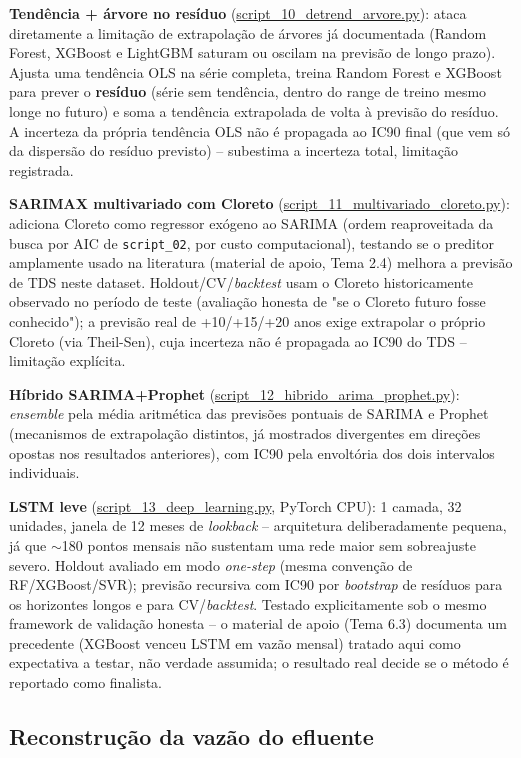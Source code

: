 \textbf{Tendência + árvore no resíduo} (\url{script_10_detrend_arvore.py}): ataca diretamente a limitação de extrapolação de árvores já documentada (Random Forest, XGBoost e LightGBM saturam ou oscilam na previsão de longo prazo). Ajusta uma tendência OLS na série completa, treina Random Forest e XGBoost para prever o \textbf{resíduo} (série sem tendência, dentro do range de treino mesmo longe no futuro) e soma a tendência extrapolada de volta à previsão do resíduo. A incerteza da própria tendência OLS não é propagada ao IC90 final (que vem só da dispersão do resíduo previsto) -- subestima a incerteza total, limitação registrada.

\textbf{SARIMAX multivariado com Cloreto} (\url{script_11_multivariado_cloreto.py}): adiciona Cloreto como regressor exógeno ao SARIMA (ordem reaproveitada da busca por AIC de \texttt{script\_02}, por custo computacional), testando se o preditor amplamente usado na literatura (material de apoio, Tema 2.4) melhora a previsão de TDS neste dataset. Holdout/CV/\textit{backtest} usam o Cloreto historicamente observado no período de teste (avaliação honesta de "se o Cloreto futuro fosse conhecido"); a previsão real de +10/+15/+20 anos exige extrapolar o próprio Cloreto (via Theil-Sen), cuja incerteza não é propagada ao IC90 do TDS -- limitação explícita.

\textbf{Híbrido SARIMA+Prophet} (\url{script_12_hibrido_arima_prophet.py}): \textit{ensemble} pela média aritmética das previsões pontuais de SARIMA e Prophet (mecanismos de extrapolação distintos, já mostrados divergentes em direções opostas nos resultados anteriores), com IC90 pela envoltória dos dois intervalos individuais.

\textbf{LSTM leve} (\url{script_13_deep_learning.py}, PyTorch CPU): 1 camada, 32 unidades, janela de 12 meses de \textit{lookback} -- arquitetura deliberadamente pequena, já que $\sim$180 pontos mensais não sustentam uma rede maior sem sobreajuste severo. Holdout avaliado em modo \textit{one-step} (mesma convenção de RF/XGBoost/SVR); previsão recursiva com IC90 por \textit{bootstrap} de resíduos para os horizontes longos e para CV/\textit{backtest}. Testado explicitamente sob o mesmo framework de validação honesta -- o material de apoio (Tema 6.3) documenta um precedente (XGBoost venceu LSTM em vazão mensal) tratado aqui como expectativa a testar, não verdade assumida; o resultado real decide se o método é reportado como finalista.

\subsection{Reconstrução da vazão do efluente}

